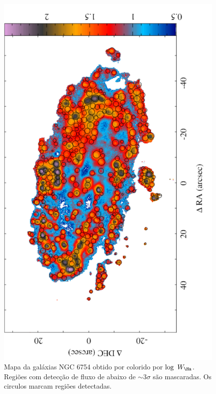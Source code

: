\begin{figure}
 \includegraphics[scale=0.45,angle=-90]{figuras/map_EW_Ha_HII.pdf}
 \caption[MUSE: Mapa de $W_{{\rm H}\alpha}$ da galáxia NGC 6754]
 {Mapa da galáxias NGC 6754 obtido por \citet{Sanchez.etal.2015MUSE} colorido por $\log\ W_{\Ha}$. Regiões com detecção de fluxo de \Ha abaixo de $\sim 3\sigma$ são mascaradas. Os circulos marcam regiões \hii detectadas.}
 \label{fig:WHaSebasMUSE}
\end{figure}


